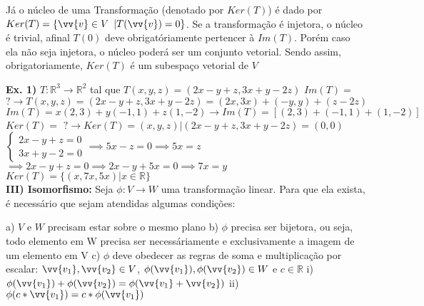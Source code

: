 \documentclass[11pt,a4paper]{article}
\newcommand\tab[1][1.835cm]{\hspace*{#1}}
\newcommand\taba[1][2.55cm]{\hspace*{#1}}
\newcommand\tabb[1][2.2cm]{\hspace*{#1}}
\begin{document}
\begin{flushleft}
\tab Já o núcleo de uma Transformação (denotado por $Ker(T)$) é dado por $Ker(T) = \{ \vv{v} \in V $ $ | T(\vv{v}) = 0\}$. Se a transformação é injetora, o núcleo é trivial, afinal $T(0)$ deve obrigatóriamente pertencer à $Im(T)$. Porém caso ela não seja injetora, o núcleo poderá ser um conjunto vetorial. Sendo assim, obrigatoriamente, $Ker(T)$ é um subespaço vetorial de $V$ \linebreak

\taba \textbf{Ex. 1)} $T: \mathbb{R}^3 \rightarrow \mathbb{R}^2$ tal que $T(x,y,z) = (2x-y+z, 3x+y-2z)$ \linebreak
\taba $Im(T) =$ $ ? \rightarrow T(x,y,z) = (2x-y+z, 3x+y-2z) = (2x,3x) + (-y,y) + (z-2z)$ \linebreak
\taba $Im(T) = x(2,3) + y(-1,1) + z(1,-2) \rightarrow Im(T) = [(2,3) + (-1,1) + (1,-2)]$ \linebreak
\newline
\taba $Ker(T) = $ $? \rightarrow Ker(T) = {(x,y,z)|(2x-y+z,3x+y-2z) = (0,0)}$ \linebreak
\taba $\begin{cases} 2x-y+z=0\\ 3x+y-2=0 \end{cases} \implies 5x-z = 0 \implies 5x = z$ \newline
\newline \taba \hspace{3.15cm} $\implies 2x-y+z =0 \implies 2x-y+5x =0 \implies 7x = y$
\newline \taba $Ker(T) = \{(x,7x,5x) | x \in \mathbb{R}\}$ \linebreak
\\
\tab \textbf{III) Isomorfismo:} Seja $\phi: V \rightarrow W$ uma transformação linear. Para que ela exista, é necessário que sejam atendidas algumas condições: \linebreak

\tabb a) $V$ e $W$ precisam estar sobre o mesmo plano \linebreak
\tabb b) $\phi$ precisa ser bijetora, ou seja, todo elemento em W precisa ser necessáriamente e exclusivamente a imagem de um elemento em V\linebreak
\tabb c) $\phi$ deve obedecer as regras de soma e multiplicação por escalar: \linebreak
\taba $\vv{v_1}, \vv{v_2} \in V$, $\phi(\vv{v_1}), \phi(\vv{v_2}) \in W$ e $c \in \mathbb{R} $ \linebreak
\taba i) $\phi(\vv{v_1}) + \phi(\vv{v_2}) = \phi(\vv{v_1} + \vv{v_2}) $ \linebreak
\taba ii) $\phi(c*\vv{v_1}) = c*\phi(\vv{v_1}) $ \linebreak


\end{flushleft}
\end{document}
